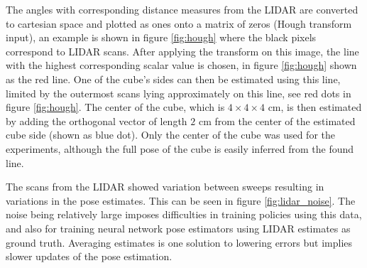 The angles with corresponding distance measures from the LIDAR are converted to
cartesian space and plotted as ones onto a matrix of zeros (Hough transform
input), an example is shown in figure \ref{fig:hough} where the black pixels
correspond to LIDAR scans. After applying the transform on this image, the line
with the highest corresponding scalar value is chosen, in figure
\ref{fig:hough} shown as the red line. One of the cube's sides can then be
estimated using this line, limited by the outermost scans lying approximately
on this line, see red dots in figure \ref{fig:hough}. The center of the cube,
which is $4\times 4\times 4$ cm, is then estimated by adding the orthogonal
vector of length $2$ cm from the center of the estimated cube side (shown as
blue dot). Only the center of the cube was used for the experiments, although
the full pose of the cube is easily inferred from the found line.

The scans from the LIDAR showed variation between sweeps resulting in
variations in the pose estimates. This can be seen in figure
\ref{fig:lidar_noise}. The noise being relatively large imposes difficulties in
training policies using this data, and also for training neural network pose
estimators using LIDAR estimates as ground truth. Averaging estimates is one
solution to lowering errors but implies slower updates of the pose estimation.

